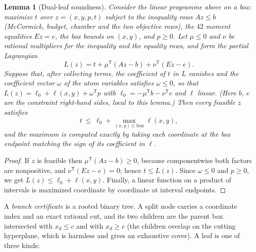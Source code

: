 \documentclass[11pt]{amsart}
\newtheorem{lemma}[theorem]{Lemma}
\theoremstyle{definition}
\theoremstyle{remark}
\begin{document}
\begin{lemma}[Dual-leaf soundness]\label{lem:dualleaf}
Consider the linear programme above on a box: maximize $t$ over
$z=(x,y,p,t)$ subject to the inequality rows $Az\le b$ (McCormick, budget,
chamber and the two objective rows), the $42$ moment equalities $Ez=e$, the
box bounds on $(x,y)$, and $p\ge0$.  Let $\mu\le0$ and $\nu$ be rational
multipliers for the inequality and the equality rows, and form the partial
Lagrangian
\[
L(z)=t+\mu^{\mathsf T}(Az-b)+\nu^{\mathsf T}(Ez-e).
\]
Suppose that, after collecting terms, the coefficient of $t$ in $L$ vanishes
and the coefficient vector $\omega$ of the atom variables satisfies
$\omega\le0$, so that $L(z)=\ell_0+\ell(x,y)+\omega^{\mathsf T}p$ with
$\ell_0=-\mu^{\mathsf T}b-\nu^{\mathsf T}e$ and $\ell$ linear.  (Here $b$,
$e$ are the constraint right-hand sides, local to this lemma.)  Then every
feasible $z$ satisfies
\[
t\ \le\ \ell_0+\max_{(x,y)\in\mathrm{box}}\ell(x,y),
\]
and the maximum is computed exactly by taking each coordinate at the box
endpoint matching the sign of its coefficient in $\ell$.
\end{lemma}

\begin{proof}
If $z$ is feasible then $\mu^{\mathsf T}(Az-b)\ge0$, because componentwise
both factors are nonpositive, and $\nu^{\mathsf T}(Ez-e)=0$; hence
$t\le L(z)$.  Since $\omega\le0$ and $p\ge0$, we get
$L(z)\le\ell_0+\ell(x,y)$.
Finally, a linear function on a product of intervals is maximized coordinate
by coordinate at interval endpoints.
\end{proof}

A \emph{branch certificate} is a rooted binary tree. A split node carries a coordinate index and an exact rational cut, and its two children are the parent box intersected with $x_d\le c$ and with $x_d\ge c$ (the children overlap on the cutting hyperplane, which is harmless and gives an exhaustive cover). A leaf is one of three kinds:
\end{document}
